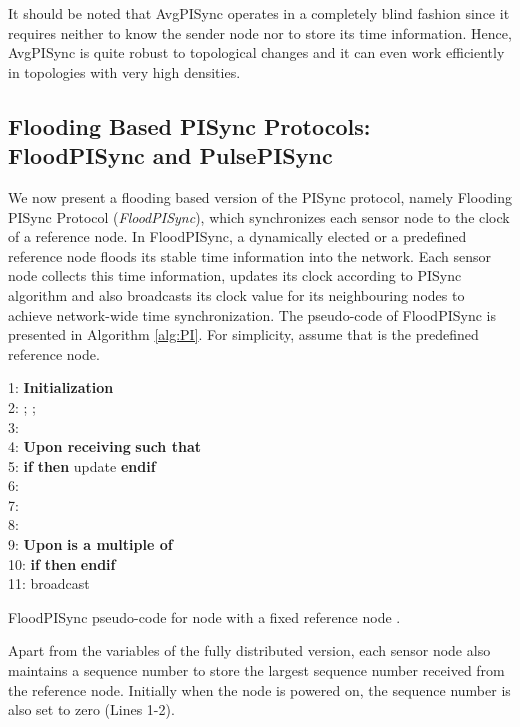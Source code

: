 \documentclass[english,a4paper,10pt,final]{article}
\numberwithin{equation}{section}
\numberwithin{figure}{section}
\begin{document}
It should be noted that AvgPISync operates in a completely blind fashion since it requires neither to know the sender node nor to store its time information. Hence, AvgPISync is quite robust to topological changes and it can even work efficiently in topologies with very high densities.

\subsection{Flooding Based PISync Protocols: FloodPISync and PulsePISync}

We now present a flooding based version of the PISync protocol, namely Flooding PISync Protocol (\textit{FloodPISync}),  which synchronizes each sensor node to the clock of a reference node. In FloodPISync, a dynamically elected or a predefined reference node floods its stable time information into the network. Each sensor node collects this time information, updates its clock according to PISync algorithm and also broadcasts its clock value for its neighbouring nodes to achieve network-wide time synchronization. The pseudo-code of FloodPISync is presented in Algorithm \ref{alg:PI}. For simplicity, assume that  is the predefined reference node. 

\begin{algorithm}

\label{alg:PI}
1:  \textbf{Initialization} \\
2: ; ;   \\
3: \\
4:  \textbf{Upon receiving}  \textbf{such that}  \\
5: \textbf{if}  \textbf{then} update  \textbf{endif}\\
6:    \\
7:    \\ 
8: \\
9:  \textbf{Upon}  \textbf{is a multiple of } \\
10: \textbf{if}  \textbf{then}  \textbf{endif} \\
11: broadcast 

\caption{FloodPISync pseudo-code for node  with a fixed reference node .}
\end{algorithm}

Apart from the variables of the fully distributed version, each sensor node  also maintains a sequence number  to store the largest sequence number received from the reference node. Initially when the node is powered on, the sequence number is also set to zero (Lines 1-2).
\end{document}
